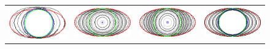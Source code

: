 \begin{figure}
\begin{tabular}{cccc}
\includegraphics[scale=0.2]{figures/chapter9/free-elastica/localsearch/ellipse/len_pen-0.01/radius-7/summary.pdf} & 
\includegraphics[scale=0.2]{figures/chapter9/free-elastica/flipflow/ellipse/len_pen-0.01/radius-7/summary.pdf} &
\includegraphics[scale=0.2]{figures/chapter9/free-elastica/balanceflow/ellipse/len_pen-0.01/radius-7/summary.pdf} &
\includegraphics[scale=0.2]{figures/chapter9/free-elastica/graphflow/ellipse/len_pen-0.01/radius-7/summary.pdf} \\[1em]

\end{tabular}
\end{figure}
